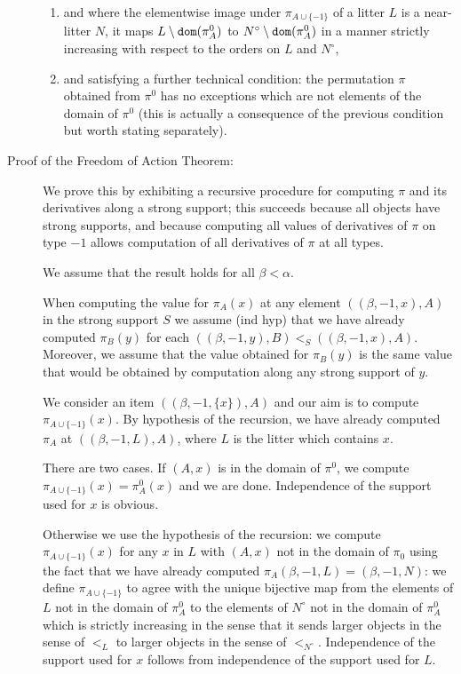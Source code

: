 \documentclass[112pt]{article}
\begin{document}
\begin{description}
\begin{enumerate}
\item and where the elementwise image under $\pi_{A\cup \{-1\}}$ of a litter $L$ is a near-litter $N$, it maps $L \setminus {\tt dom}(\pi^0_A)$ to $N^\circ \setminus {\tt dom}(\pi^0_A)$ in a manner strictly increasing with respect to the orders on $L$ and $N^\circ$,

\item and satisfying a further technical condition:    the permutation $\pi$ obtained from $\pi^0$ has no exceptions which are not elements of the domain of $\pi^0$ (this is actually a consequence of the previous condition but worth stating separately).

\end{enumerate}

\item[Proof of the Freedom of Action Theorem:]  We prove this by exhibiting a recursive procedure for computing $\pi$ and its derivatives along a strong support;  this succeeds because all objects have
strong supports, and because computing all values of derivatives of $\pi$ on type $-1$ allows computation of all derivatives of $\pi$ at all types.

We assume that the result holds for all $\beta<\alpha$.

When computing the value for $\pi_A(x)$ at any element $((\beta,-1,x),A)$ in the strong support $S$ we assume (ind hyp) that we have already computed
$\pi_B(y)$ for each $((\beta,-1,y),B) <_S ((\beta,-1,x),A)$.  Moreover, we assume that the value obtained for $\pi_B(y)$ is the same value that would be obtained by computation along any strong support of $y$.

We consider an item $((\beta,-1,\{x\}),A)$ and our aim is to compute $\pi_{A \cup \{-1\}}(x)$.  By hypothesis of the recursion, we have already
computed $\pi_A$ at $((\beta,-1,L),A)$, where $L$ is the litter which contains $x$.

There are two cases.  If $(A,x)$ is in the domain of $\pi^0$, we compute $\pi_{A \cup \{-1\}}(x) = \pi^0_A(x)$ and we are done.  Independence of the support used for $x$ is obvious.

Otherwise we use the hypothesis of the recursion:  we compute $\pi_{A \cup \{-1\}}(x)$ for any $x$ in $L$ with $(A,x)$ not in the domain of $\pi_0$ using the fact that we have already computed $\pi_A(\beta,-1,L) = (\beta,-1,N)$:  we define $\pi_{A \cup \{-1\}}$ to agree with the unique bijective map from the
elements of $L$ not in the domain of $\pi^0_A$ to the elements of $N^{\circ}$ not in the domain of $\pi^0_A$ which is strictly increasing in the sense that it sends larger objects in the sense of $<_L$ to larger objects in the sense of $<_{N^{\circ}}$.  Independence of the support used for $x$ follows from independence of the support used for $L$.


\end{description}
\end{document}
